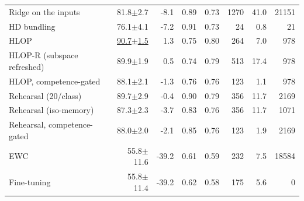 \begin{tabular}{lrrrrrrr}
Ridge on the inputs & 81.8{\tiny$\pm$2.7} & -8.1 & 0.89 & 0.73 & 1270 & 41.0 & 21151 \\
HD bundling & 76.1{\tiny$\pm$4.1} & -7.2 & 0.91 & 0.73 & 24 & 0.8 & 21 \\
HLOP & \underline{90.7{\tiny$\pm$1.5}} & 1.3 & 0.75 & 0.80 & 264 & 7.0 & 978 \\
HLOP-R (subspace refreshed) & 89.9{\tiny$\pm$1.9} & 0.5 & 0.74 & 0.79 & 513 & 17.4 & 978 \\
HLOP, competence-gated & 88.1{\tiny$\pm$2.1} & -1.3 & 0.76 & 0.76 & 123 & 1.1 & 978 \\
Rehearsal (20/class) & 89.7{\tiny$\pm$2.9} & -0.4 & 0.90 & 0.79 & 356 & 11.7 & 2169 \\
Rehearsal (iso-memory) & 87.3{\tiny$\pm$2.3} & -3.7 & 0.83 & 0.76 & 356 & 11.7 & 1071 \\
Rehearsal, competence-gated & 88.0{\tiny$\pm$2.0} & -2.1 & 0.85 & 0.76 & 123 & 1.9 & 2169 \\
EWC & 55.8{\tiny$\pm$11.6} & -39.2 & 0.61 & 0.59 & 232 & 7.5 & 18584 \\
Fine-tuning & 55.8{\tiny$\pm$11.4} & -39.2 & 0.62 & 0.58 & 175 & 5.6 & 0 \\
\bottomrule
\end{tabular}
